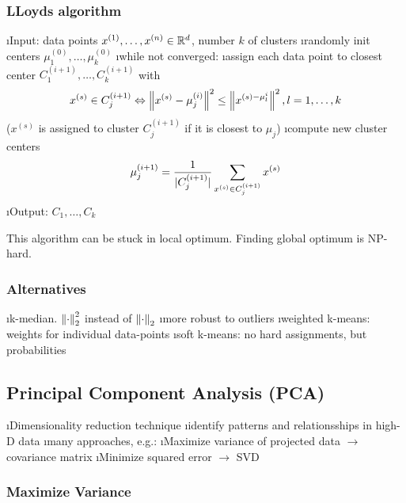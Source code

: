 \subsubsection{LLoyds algorithm}

\be
\i Input: data points $x^{(1)}, \ldots, x^{(n)} \in \mathbb{R}^d$, number $k$ of clusters
\i randomly init centers $\mu^{(0)}_1,\ldots,\mu^{(0)}_k$
\i while not converged:
\be
\i assign each data point to closest center $C^{(i+1)}_1, \ldots, C^{(i+1)}_k$ with \[
x^{(s)} \in C^{(i+1)}_j \Leftrightarrow \left\lVert x^{(s)} - \mu_j^{(i)}\right\rVert^2 \leq \left\lVert x^{(s) - \mu_l^{i}}\right\rVert^2, l = 1, \ldots, k
\] ($x^{(s)}$ is assigned to cluster $C^{(i+1)}_j$ if it is closest to $\mu_j$)
\i compute new cluster centers \[
\mu_j^{(i+1)} = \frac{1}{\vert C^{(i+1)}_j \vert} \displaystyle\sum_{x^{(s)} \in C^{(i+1)}_j} x^{(s)}
\]
\ee
\i Output: $C_1, \ldots, C_k$
\ee

This algorithm can be stuck in local optimum. Finding global optimum is NP-hard.

\subsubsection{Alternatives}

\bi
\i k-median. $\left\lVert\cdot\right\rVert_2^2$ instead of $\left\lVert\cdot\right\rVert_2$
\bi
\i more robust to outliers
\ei
\i weighted k-means: weights for individual data-points
\i soft k-means: no hard assignments, but probabilities
\ei

\subsection{Principal Component Analysis (PCA)}

\bi
\i Dimensionality reduction technique
\i identify patterns and relationsships in high-D data
\i many approaches, e.g.:
\bi
\i Maximize variance of projected data $\to$ covariance matrix
\i Minimize squared error $\to$ SVD
\ei
\ei

\subsubsection{Maximize Variance}

